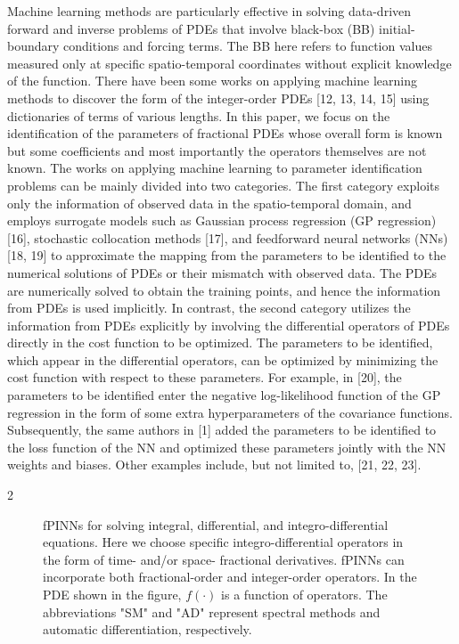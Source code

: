 \documentclass[UTF8]{article}
\begin{document}
Machine learning methods are particularly effective in solving data-driven forward and inverse problems of PDEs that involve black-box (BB) initial-boundary conditions and forcing terms. The BB here refers to function values measured only at specific spatio-temporal coordinates without explicit knowledge of the function. There have been some works on applying machine learning methods to discover the form of the integer-order PDEs [12, 13, 14, 15] using dictionaries of terms of various lengths. In this paper, we focus on the identification of the parameters of fractional PDEs whose overall form is known but some coefficients and most importantly the operators themselves are not known. The works on applying machine learning to parameter identification problems can be mainly divided into two categories. The first category exploits only the information of observed data in the spatio-temporal domain, and employs surrogate models such as Gaussian process regression (GP regression) [16], stochastic collocation methods [17], and feedforward neural networks (NNs) [18, 19] to approximate the mapping from the parameters to be identified to the numerical solutions of PDEs or their mismatch with observed data. The PDEs are numerically solved to obtain the training points, and hence the information from PDEs is used implicitly. In contrast, the second category utilizes the information from PDEs explicitly by involving the differential operators of PDEs directly in the cost function to be optimized. The parameters to be identified, which appear in the differential operators, can be optimized by minimizing the cost function with respect to these parameters. For example, in [20], the parameters to be identified enter the negative log-likelihood function of the GP regression in the form of some extra hyperparameters of the covariance functions. Subsequently, the same authors in [1] added the parameters to be identified to the loss function of the NN and optimized these parameters jointly with the NN weights and biases. Other examples include, but not limited to, [21, 22, 23].

\vfill
2

\begin{figure}[h]
    \centering
    \caption{fPINNs for solving integral, differential, and integro-differential equations. Here we choose specific integro-differential operators in the form of time- and/or space- fractional derivatives. fPINNs can incorporate both fractional-order and integer-order operators. In the PDE shown in the figure, $f(\cdot)$ is a function of operators. The abbreviations "SM" and "AD" represent spectral methods and automatic differentiation, respectively.}
\end{figure}
\end{document}
